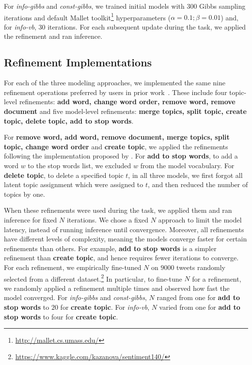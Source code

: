 For \textit{info-gibbs} and \textit{const-gibbs}, we trained initial \lda{}
models with $300$ Gibbs sampling iterations and default Mallet toolkit\footnote{\url{http://mallet.cs.umass.edu/}} hyperparameters ($\alpha=0.1; \beta=0.01$)
and, for \textit{info-vb}, $30$  iterations.
For each subsequent update during the task, we applied the refinement
and ran inference.


\subsection{Refinement Implementations}

For each of the three \hltm{} modeling approaches, we implemented the same nine
refinement operations preferred by users in prior
work~\cite{Lee2017TheModels,Musialek2016UsingApproach,Smith2018ClosingSystem}. These include four topic-level refinements: \textbf{add word, change word order, remove word, remove document} and five model-level refinements: \textbf{merge topics, split topic, create topic, delete topic, add to stop words}. 

For \textbf{remove word, add word, remove document, merge topics, split
  topic, change word order} and \textbf{create topic}, we
applied the refinements following the implementation proposed by
.
For \textbf{add to stop words}, to add a word $w$ to the stop words list, we excluded $w$ from
the model vocabulary. For \textbf{delete topic}, to delete a specified topic $t$, in all three
models, we first forgot all latent topic assignment which were
assigned to $t$, and then reduced the number of topics by one.

When these refinements were used during the task, we applied them
and ran inference for fixed $N$ iterations.
We chose a fixed $N$ approach to limit the model latency, instead of running inference until convergence.
Moreover, all refinements have different levels of complexity, meaning the models
converge faster for certain refinements than others.
For example, \textbf{add to stop words} is a simpler refinement than
\textbf{create topic}, and hence requires fewer iterations to
converge.
For each refinement, we empirically fine-tuned $N$ on $9000$ tweets
randomly selected from a different
dataset.\footnote{\url{https://www.kaggle.com/kazanova/sentiment140/}} In
particular, to fine-tune $N$ for a refinement, we randomly applied a
refinement multiple times and observed how fast the model converged.
For \textit{info-gibbs} and \textit{const-gibbs}, $N$ ranged from one
for \textbf{add to stop words} to $20$ for \textbf{create topic}. For
\textit{info-vb}, $N$ varied from one for \textbf{add to stop words}
to four for \textbf{create topic}.

